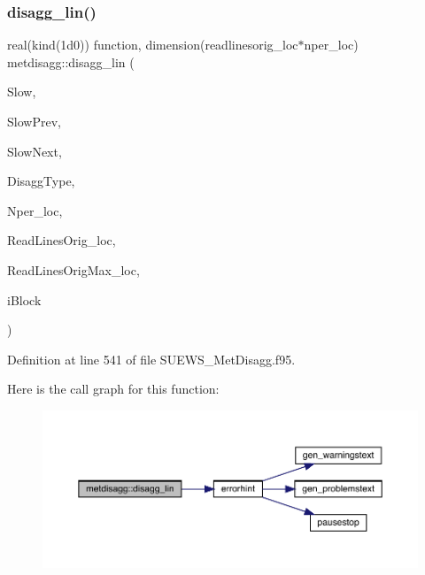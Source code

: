 \subsubsection{\texorpdfstring{disagg\+\_\+lin()}{disagg\_lin()}}
{\footnotesize\ttfamily real(kind(1d0)) function, dimension(readlinesorig\+\_\+loc$\ast$nper\+\_\+loc) metdisagg\+::disagg\+\_\+lin (\begin{DoxyParamCaption}\item[{real(kind(1d0)), dimension(readlinesorig\+\_\+loc)}]{Slow,  }\item[{real(kind(1d0))}]{Slow\+Prev,  }\item[{real(kind(1d0))}]{Slow\+Next,  }\item[{integer}]{Disagg\+Type,  }\item[{integer}]{Nper\+\_\+loc,  }\item[{integer}]{Read\+Lines\+Orig\+\_\+loc,  }\item[{integer}]{Read\+Lines\+Orig\+Max\+\_\+loc,  }\item[{integer}]{i\+Block }\end{DoxyParamCaption})}



Definition at line 541 of file S\+U\+E\+W\+S\+\_\+\+Met\+Disagg.\+f95.

Here is the call graph for this function\+:\nopagebreak
\begin{figure}[H]
\begin{center}
\leavevmode
\includegraphics[width=350pt]{namespacemetdisagg_a8ad05f5320b2c1380934b4fbd591bbb9_cgraph}
\end{center}
\end{figure}
\mbox{\label{namespacemetdisagg_a68fe3bfaf0b4ea325a7560e9c5ed518a}} 
